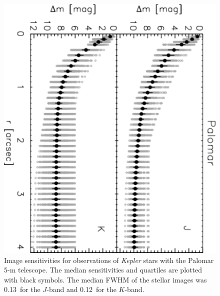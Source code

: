 \documentclass[twocolumn,appendixfloats]{aastex6}
\begin{document}
\begin{figure}[!t]
\centering
\includegraphics[angle=90, scale=0.47]{Palomar_AO_images_sensitivities.pdf}
\caption{Image sensitivities for observations of {\it Kepler} stars with the 
Palomar 5-m telescope. The median sensitivities and quartiles are plotted 
with black symbols. The median FWHM of the stellar images was
0.13\arcsec\ for the $J$-band and 0.12\arcsec\ for the $K$-band.
\label{sensitivites_Palomar}}
\end{figure}
\end{document}

